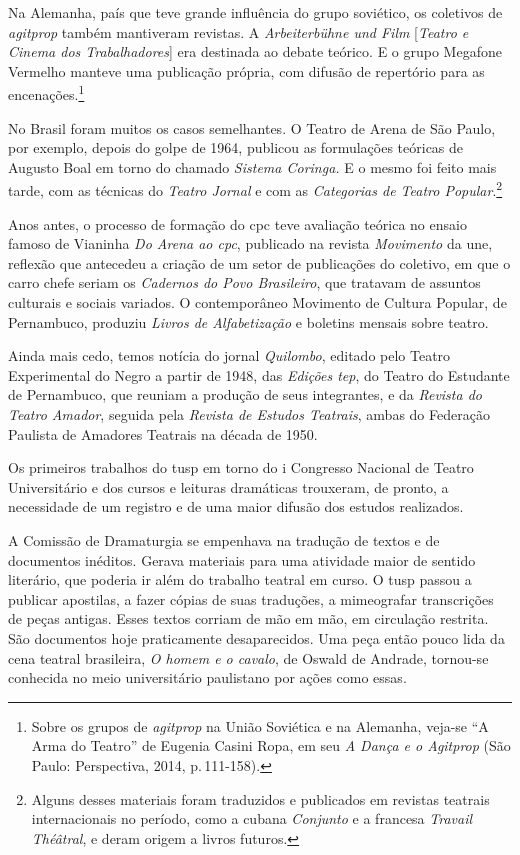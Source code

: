 Na Alemanha, país que teve grande influência do grupo soviético, os
coletivos de {\it agitprop} também mantiveram revistas. A
{\it Arbeiterbühne und Film} {[}{\it Teatro e Cinema dos
Trabalhadores}{]} era destinada ao debate teórico. E o grupo Megafone
Vermelho manteve uma publicação própria, com difusão de repertório para
as encenações.\footnote{Sobre os grupos de {\it agitprop} na União
  Soviética e na Alemanha, veja-se “A Arma do Teatro” de Eugenia Casini
  Ropa, em seu {\it A Dança e o Agitprop} (São Paulo: Perspectiva, 2014,
  p.\,111-158).}

No Brasil foram muitos os casos semelhantes. O Teatro de Arena de São
Paulo, por exemplo, depois do golpe de 1964, publicou as formulações
teóricas de Augusto Boal em torno do chamado {\it Sistema Coringa.} E o
mesmo foi feito mais tarde, com as técnicas do {\it Teatro Jornal} e com
as {\it Categorias de Teatro Popular}.\footnote{Alguns desses materiais
  foram traduzidos e publicados em revistas teatrais internacionais no
  período, como a cubana {\it Conjunto} e a francesa {\it Travail
  Théâtral}, e deram origem a livros futuros.}

Anos antes, o processo de formação do {\sc cpc} teve avaliação teórica no
ensaio famoso de Vianinha {\it Do Arena ao {\sc cpc}}, publicado na revista
{\it Movimento} da {\sc une}, reflexão que antecedeu a criação de um setor de
publicações do coletivo, em que o carro chefe seriam os {\it Cadernos do
Povo Brasileiro}, que tratavam de assuntos culturais e sociais variados.
O contemporâneo Movimento de Cultura Popular, de Pernambuco, produziu
{\it Livros de Alfabetização} e boletins mensais sobre teatro.

Ainda mais cedo, temos notícia do jornal {\it Quilombo}, editado pelo
Teatro Experimental do Negro a partir de 1948, das {\it Edições {\sc tep}}, do
Teatro do Estudante de Pernambuco, que reuniam a produção de seus
integrantes, e da {\it Revista do Teatro Amador}, seguida pela
{\it Revista de Estudos Teatrais}, ambas do Federação Paulista de
Amadores Teatrais na década de 1950.

Os primeiros trabalhos do {\sc tusp} em torno do {\sc i} Congresso Nacional de
Teatro Universitário e dos cursos e leituras dramáticas trouxeram, de
pronto, a necessidade de um registro e de uma maior difusão dos estudos
realizados.

A Comissão de Dramaturgia se empenhava na tradução de textos e de
documentos inéditos. Gerava materiais para uma atividade maior de
sentido literário, que poderia ir além do trabalho teatral em curso. O
{\sc tusp} passou a publicar apostilas, a fazer cópias de suas traduções, a
mimeografar transcrições de peças antigas. Esses textos corriam de mão
em mão, em circulação restrita. São documentos hoje praticamente
desaparecidos. Uma peça então pouco lida da cena teatral brasileira,
{\it O homem e o cavalo}, de Oswald de Andrade, tornou-se conhecida no
meio universitário paulistano por ações como essas.

